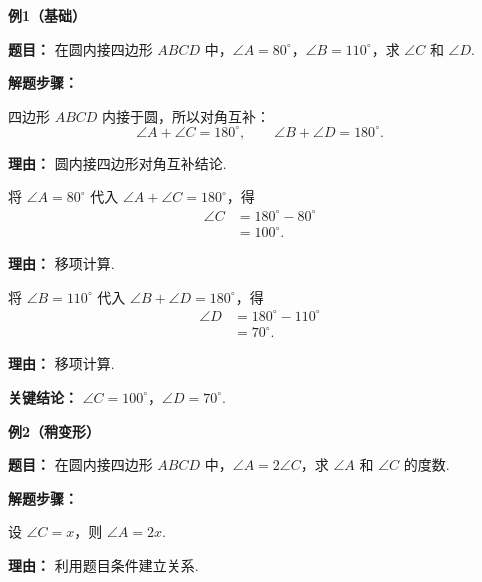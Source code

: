 \begin{examplebox}
	\textbf{\textcolor{CExample}{例1（基础）}}

	\textbf{\textcolor{CExample}{题目：}}
	在圆内接四边形 $ABCD$ 中，$\angle A = 80^\circ$，$\angle B = 110^\circ$，求 $\angle C$ 和 $\angle D$.

	\textbf{\textcolor{CExample}{解题步骤：}}
	\begin{description}[style=nextline, leftmargin=2.8em, labelsep=0.5em, itemsep=0.45em]
		\item[\textbf{第一步（利用互补）：}] 四边形 $ABCD$ 内接于圆，所以对角互补：
			\[
				\angle A + \angle C = 180^\circ,
				\qquad
				\angle B + \angle D = 180^\circ.
			\]
			\par\textbf{理由：}
			圆内接四边形对角互补结论.

		\item[\textbf{第二步（求 $\angle C$）：}] 将 $\angle A = 80^\circ$ 代入 $\angle A + \angle C = 180^\circ$，得
			\[
				\begin{aligned}
					\angle C &= 180^\circ - 80^\circ \\
					&= 100^\circ.
			\end{aligned}
			\]
			\par\textbf{理由：}
			移项计算.

		\item[\textbf{第三步（求 $\angle D$）：}] 将 $\angle B = 110^\circ$ 代入 $\angle B + \angle D = 180^\circ$，得
			\[
				\begin{aligned}
					\angle D &= 180^\circ - 110^\circ \\
					&= 70^\circ.
			\end{aligned}
			\]
			\par\textbf{理由：}
			移项计算.
	\end{description}

	\textbf{\textcolor{CExample}{关键结论：}}
	$\angle C = 100^\circ$，$\angle D = 70^\circ$.

	\medskip
	\textbf{\textcolor{CExample}{例2（稍变形）}}

	\textbf{\textcolor{CExample}{题目：}}
	在圆内接四边形 $ABCD$ 中，$\angle A = 2\angle C$，求 $\angle A$ 和 $\angle C$ 的度数.

	\textbf{\textcolor{CExample}{解题步骤：}}
	\begin{description}[style=nextline, leftmargin=2.8em, labelsep=0.5em, itemsep=0.45em]
		\item[\textbf{第一步（设未知数）：}] 设 $\angle C = x$，则 $\angle A = 2x$.
			\par\textbf{理由：}
			利用题目条件建立关系.


\end{description}
\end{examplebox}
